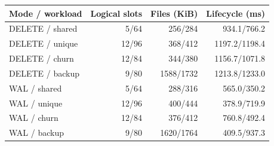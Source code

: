\begin{tabular}{@{}lrrr@{}}
\toprule
Mode / workload & Logical slots & Files (KiB) & Lifecycle (ms)\\
\midrule
DELETE / shared & 5/64 & 256/284 & 934.1/766.2 \\
DELETE / unique & 12/96 & 368/412 & 1197.2/1198.4 \\
DELETE / churn & 12/84 & 344/380 & 1156.7/1071.8 \\
DELETE / backup & 9/80 & 1588/1732 & 1213.8/1233.0 \\
WAL / shared & 5/64 & 288/316 & 565.0/350.2 \\
WAL / unique & 12/96 & 400/444 & 378.9/719.9 \\
WAL / churn & 12/84 & 376/412 & 760.8/492.4 \\
WAL / backup & 9/80 & 1620/1764 & 409.5/937.3 \\
\bottomrule
\end{tabular}
